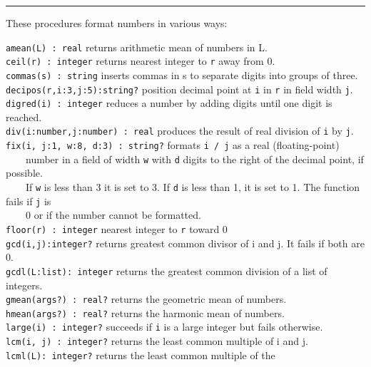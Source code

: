 \vspace{0.25cm}\hrule{}

These procedures format numbers in various ways:

\texttt{amean(L) : real} returns arithmetic mean of
numbers in L.\\
\texttt{ceil(r) : integer} returns nearest integer to
\texttt{r} away from 0.\\
\texttt{commas(s) : string} inserts commas in s to separate digits into
groups of three.\\
\texttt{decipos(r,i:3,j:5):string?} position decimal point at \texttt{i}
in \texttt{r} in field width \texttt{j}.\\
\texttt{digred(i) : integer} reduces a number by adding digits until one
digit is reached.\\
\texttt{div(i:number,j:number) : real} produces the result of real
division of \texttt{i} by \texttt{j}.\\
\texttt{fix(i, j:1, w:8, d:3) : string?} formats \texttt{i / j} as a
real (floating-point)\\
 \ \ \ \ number in a field of width \texttt{w} with \texttt{d} digits to
the right of the decimal point, if possible.\\
 \ \ \ \ If \texttt{w} is less than 3 it is set to 3. If \texttt{d} is
less than 1, it is set to 1. The function fails if \texttt{j}
is\\
 \ \ \ \ 0 or if the number cannot be formatted.\\
\texttt{floor(r)}\texttt{ : integer} nearest integer to
\texttt{r} toward 0\\
\texttt{gcd(i,j):integer?} returns greatest common divisor of i and j.
It fails if both are 0.\\
\texttt{gcdl(L:list): integer} returns the greatest common division of a
list of integers.\\
\texttt{gmean(args?) : real?} returns the geometric mean of
numbers.\\
\texttt{hmean(args?) : real?} returns the harmonic mean of
numbers.\\
\texttt{large(i) : integer?} succeeds if \texttt{i} is a large integer
but fails otherwise.\\
\texttt{lcm(i, j) : integer?} returns the least common multiple of i and
j.\\
\texttt{lcml(L): integer?} returns the least common multiple of the
